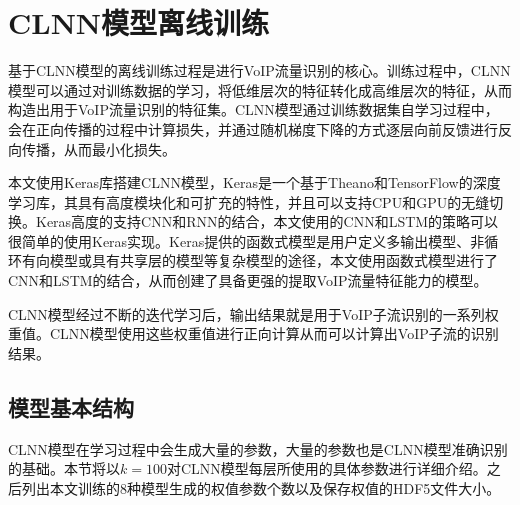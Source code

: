 \section{CLNN模型离线训练}
基于CLNN模型的离线训练过程是进行VoIP流量识别的核心。训练过程中，CLNN模型可以通过对训练数据的学习，将低维层次的特征转化成高维层次的特征，从而构造出用于VoIP流量识别的特征集。CLNN模型通过训练数据集自学习过程中，会在正向传播的过程中计算损失，并通过随机梯度下降的方式逐层向前反馈进行反向传播，从而最小化损失。

本文使用Keras库搭建CLNN模型，Keras是一个基于Theano和TensorFlow的深度学习库，其具有高度模块化和可扩充的特性，并且可以支持CPU和GPU的无缝切换。Keras高度的支持CNN和RNN的结合，本文使用的CNN和LSTM的策略可以很简单的使用Keras实现。Keras提供的函数式模型是用户定义多输出模型、非循环有向模型或具有共享层的模型等复杂模型的途径，本文使用函数式模型进行了CNN和LSTM的结合，从而创建了具备更强的提取VoIP流量特征能力的模型。

CLNN模型经过不断的迭代学习后，输出结果就是用于VoIP子流识别的一系列权重值。CLNN模型使用这些权重值进行正向计算从而可以计算出VoIP子流的识别结果。

\subsection{模型基本结构}
CLNN模型在学习过程中会生成大量的参数，大量的参数也是CLNN模型准确识别的基础。本节将以$k=100$对CLNN模型每层所使用的具体参数进行详细介绍。之后列出本文训练的8种模型生成的权值参数个数以及保存权值的HDF5文件大小。

